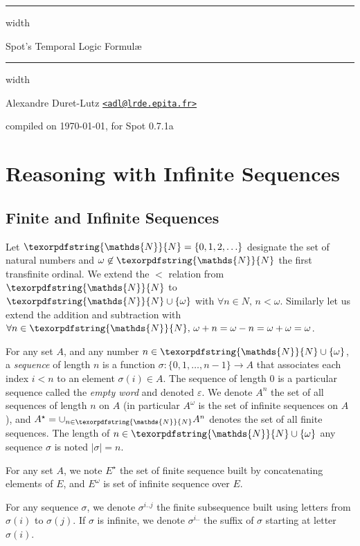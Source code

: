 \documentclass[a4paper,twoside,10pt,DIV=12,draft]{scrreprt}
\newcommand{\N}{\texorpdfstring{\ensuremath{\mathds{N}}}{N}}
\newcommand{\0}{\texttt{0}}
\newcommand{\1}{\texttt{1}}
\def\SpotVersion{0.7.1a}
\def\manualtitle{Spot's Temporal Logic Formul\ae}
\begin{document}
\vspace*{50pt}
\vskip4pt \hrule height 4pt width \hsize \vskip4pt
\begin{center}
  \huge \manualtitle
\end{center}
\vspace*{-1.5ex}
\vskip4pt \hrule height 4pt width \hsize \vskip4pt

\hfill Alexandre Duret-Lutz
\href{mailto:adl@lrde.epita.fr}{\nolinkurl{<adl@lrde.epita.fr>}}

\hfill compiled on \today, for Spot \SpotVersion

\vfill

\setcounter{tocdepth}{2}
\makeatletter
{}
\makeatother

\vfill

\chapter{Reasoning with Infinite Sequences}

\section{Finite and Infinite Sequences}

Let $\N=\{0,1,2,\ldots\}$ designate the set of natural numbers and
$\omega\not\in\N$ the first transfinite ordinal.  We extend the $<$
relation from $\N$ to $\N\cup\{\omega\}$ with $\forall n\in N,\,
n<\omega$.  Similarly let us extend the addition and subtraction with
$\forall n\in\N,\,\omega+n = \omega-n = \omega+\omega = \omega$.

For any set $A$, and any number $n\in\N\cup\{\omega\}$, a
\textit{sequence} of length $n$ is a function $\sigma:
\{0,1,\ldots,n-1\}\to A$ that associates each index $i<n$ to an
element $\sigma(i)\in A$.  The sequence of length $0$ is a particular
sequence called the \textit{empty word} and denoted $\varepsilon$.  We
denote $A^n$ the set of all sequences of length $n$ on $A$ (in
particular $A^\omega$ is the set of infinite sequences on $A$), and
$A^\star=\cup_{n\in\N}A^n$ denotes the set of all finite sequences.
The length of $n\in\N\cup\{\omega\}$ any sequence $\sigma$ is noted
$|\sigma|=n$.

For any set $A$, we note $E^\star$ the set of finite sequence
built by concatenating elements of $E$, and $E^\omega$ is set of
infinite sequence over $E$.

For any sequence $\sigma$, we denote $\sigma^{i..j}$ the finite
subsequence built using letters from $\sigma(i)$ to $\sigma(j)$.  If
$\sigma$ is infinite, we denote $\sigma^{i..}$ the suffix of $\sigma$
starting at letter $\sigma(i)$.
\end{document}
